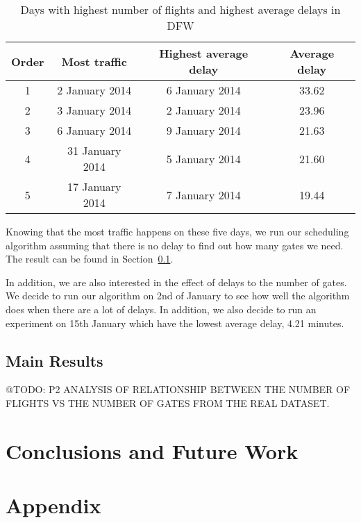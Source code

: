 \documentclass[11pt,a4paper]{article}
\begin{document}
\begin{table}
\caption{Days with highest number of flights and highest average delays in DFW}
\centering
\begin{tabular}{| c | c | c | c |}
\hline
Order & Most traffic & Highest average delay & Average delay \\
\hline
1 & 2 January 2014 & 6 January 2014 & 33.62\\
2 & 3 January 2014 & 2 January 2014 & 23.96\\
3 & 6 January 2014 & 9 January 2014 & 21.63\\
4 & 31 January 2014 & 5 January 2014 & 21.60\\
5 & 17 January 2014 & 7 January 2014 & 19.44\\
\hline
\end{tabular}
\label{table:airport-dfw-delay}
\end{table}

Knowing that the most traffic happens on these five days, we run our scheduling algorithm assuming that there is no delay to find out how many gates we need. The result can be found in Section~\ref{subsec:expo-resu}. \par 
In addition, we are also interested in the effect of delays to the number of gates. We decide to run our algorithm on 2nd of January to see how well the algorithm does when there are a lot of delays. In addition, we also decide to run an experiment on 15th January which have the lowest average delay, 4.21 minutes.

\subsection{Main Results}
\label{subsec:expo-resu}
@TODO: P2 ANALYSIS OF RELATIONSHIP BETWEEN THE NUMBER OF FLIGHTS VS THE NUMBER OF GATES FROM THE REAL DATASET.

\section{Conclusions and Future Work}
\label{sec:conc}




\section*{Appendix}
\end{document}
